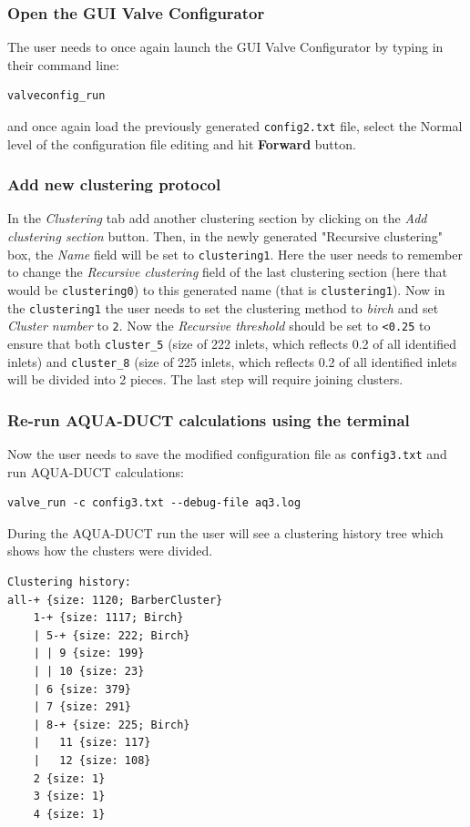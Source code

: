 \documentclass[9pt,tutorial]{livecoms}
\begin{document}
\subsubsection{Open the GUI Valve Configurator}
The user needs to once again launch the GUI Valve Configurator by typing in their command line:
\begin{lstlisting}
valveconfig_run
\end{lstlisting}
and once again load the previously generated \texttt{config2.txt} file, select the Normal level of the configuration file editing and hit \textbf{Forward} button. 

\subsubsection{Add new clustering protocol}
In the \textit{Clustering} tab add another clustering section by clicking on the \textit{Add clustering section} button. Then, in the newly generated "Recursive clustering" box, the \textit{Name} field will be set to \texttt{clustering1}. Here the user needs to remember to change the \textit{Recursive clustering} field of the last clustering section (here that would be \texttt{clustering0}) to this generated name (that is \texttt{clustering1}). Now in the \texttt{clustering1} the user needs to set the clustering method to \emph{birch} and set \emph{Cluster number} to \texttt{2}. Now the \emph{Recursive threshold} should be set to \texttt{<0.25} to ensure that both \texttt{cluster\_5} (size of 222 inlets, which reflects 0.2 of all identified inlets) and \texttt{cluster\_8} (size of 225 inlets, which reflects 0.2 of all identified inlets will be divided into 2 pieces. The last step will require joining clusters.

\subsubsection{Re-run AQUA-DUCT calculations using the terminal}
Now the user needs to save the modified configuration file as \texttt{config3.txt} and run AQUA-DUCT calculations:
\begin{lstlisting}[columns=fullflexible]
valve_run -c config3.txt --debug-file aq3.log
\end{lstlisting}
During the AQUA-DUCT run the user will see a clustering history tree which shows how the clusters were divided.
\begin{lstlisting}
Clustering history:
all-+ {size: 1120; BarberCluster}
    1-+ {size: 1117; Birch}
    | 5-+ {size: 222; Birch}
    | | 9 {size: 199}
    | | 10 {size: 23}
    | 6 {size: 379}
    | 7 {size: 291}
    | 8-+ {size: 225; Birch}
    |   11 {size: 117}
    |   12 {size: 108}
    2 {size: 1}
    3 {size: 1}
    4 {size: 1}
\end{lstlisting}
\end{document}
